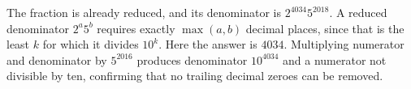 The fraction is already reduced, and its denominator is $2^{4034}5^{2018}$. A reduced denominator $2^a5^b$ requires exactly $\max(a,b)$ decimal places, since that is the least $k$ for which it divides $10^k$. Here the answer is $\boxed{4034}$. Multiplying numerator and denominator by $5^{2016}$ produces denominator $10^{4034}$ and a numerator not divisible by ten, confirming that no trailing decimal zeroes can be removed.
